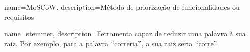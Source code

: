 
{
   name=MoSCoW,
   description={Método de priorização de funcionalidades ou requisitos }
}


{
    name=stemmer,
    description={Ferramenta capaz de reduzir uma palavra à sua raiz. Por exemplo, para a palavra ``correria'', a sua raiz seria ``corre''. }
 }
